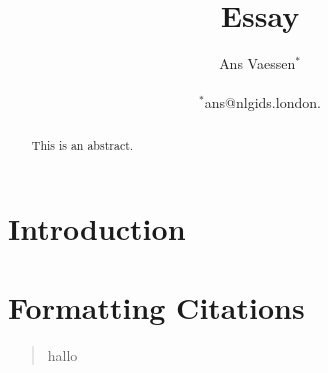 \documentclass[12pt]{article}
\title{Essay}
\author
{Ans Vaessen$^{\ast}$\\
\\
\normalsize{$^{\ast}$ans@nlgids.london.}\\
}
\date{}
\begin{document}
 
\maketitle 

\begin{abstract}
This is an abstract.
\end{abstract}

\section*{Introduction}

\section{Formatting Citations}

\begin{quote}
hallo
\end{quote}
\end{document}
